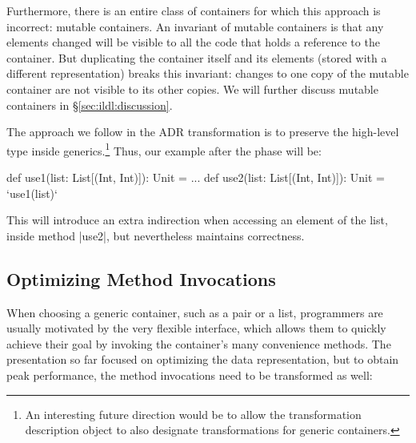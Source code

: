 Furthermore, there is an entire class of containers for which this approach is incorrect: mutable containers. An invariant of mutable containers is that any elements changed will be visible to all the code that holds a reference to the container. But duplicating the container itself and its elements (stored with a different representation) breaks this invariant: changes to one copy of the mutable container are not visible to its other copies. We will further discuss mutable containers in \S\ref{sec:ildl:discussion}.

The approach we follow in the ADR transformation is to
preserve the high-level type inside generics.\footnote{An interesting
  future direction would be to allow the transformation description
  object to also designate transformations for generic containers.}
Thus, our example after the \commit{} phase will be:

\begin{lstlisting-nobreak}
def use1(list: List[(Int, Int)]): Unit = ...
def use2(list: List[(Int, Int)]): Unit = `use1(list)`
\end{lstlisting-nobreak}

This will introduce an extra indirection when accessing an element of the list, inside method |use2|, but nevertheless maintains correctness.



\subsection{Optimizing Method Invocations}
\label{sec:ildl:semantics}

When choosing a generic container, such as a pair or a list, programmers are usually motivated by the very flexible interface, which allows them to quickly achieve their goal by invoking the container's many convenience methods. The presentation so far focused on optimizing the data representation, but to obtain peak performance, the method invocations need to be transformed as well:

